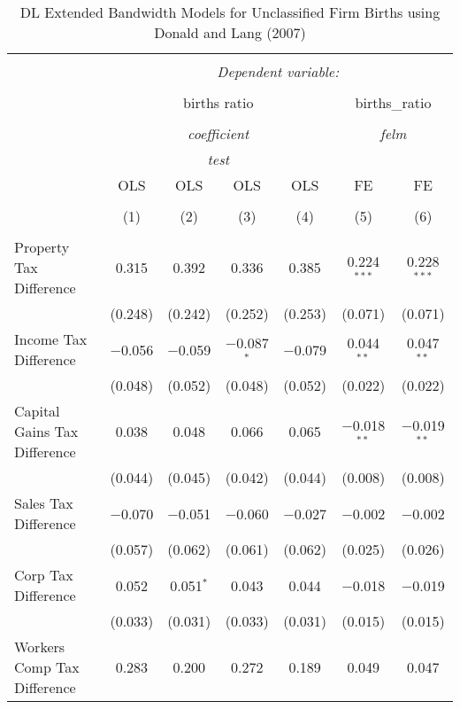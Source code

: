 
\begin{table}[!htbp] \centering 
  \caption{DL Extended Bandwidth Models for  Unclassified Firm Births using Donald and Lang (2007)} 
  \label{} 
\begin{tabular}{@{\extracolsep{5pt}}lcccccc} 
\\[-1.8ex]\hline 
\hline \\[-1.8ex] 
 & \multicolumn{6}{c}{\textit{Dependent variable:}} \\ 
\cline{2-7} 
\\[-1.8ex] & \multicolumn{4}{c}{births ratio} & \multicolumn{2}{c}{births\_ratio} \\ 
\\[-1.8ex] & \multicolumn{4}{c}{\textit{coefficient}} & \multicolumn{2}{c}{\textit{felm}} \\ 
 & \multicolumn{4}{c}{\textit{test}} & \multicolumn{2}{c}{\textit{}} \\ 
 & OLS & OLS & OLS & OLS & FE & FE \\ 
\\[-1.8ex] & (1) & (2) & (3) & (4) & (5) & (6)\\ 
\hline \\[-1.8ex] 
 Property Tax Difference & 0.315 & 0.392 & 0.336 & 0.385 & 0.224$^{***}$ & 0.228$^{***}$ \\ 
  & (0.248) & (0.242) & (0.252) & (0.253) & (0.071) & (0.071) \\ 
  Income Tax Difference & $-$0.056 & $-$0.059 & $-$0.087$^{*}$ & $-$0.079 & 0.044$^{**}$ & 0.047$^{**}$ \\ 
  & (0.048) & (0.052) & (0.048) & (0.052) & (0.022) & (0.022) \\ 
  Capital Gains Tax Difference & 0.038 & 0.048 & 0.066 & 0.065 & $-$0.018$^{**}$ & $-$0.019$^{**}$ \\ 
  & (0.044) & (0.045) & (0.042) & (0.044) & (0.008) & (0.008) \\ 
  Sales Tax Difference & $-$0.070 & $-$0.051 & $-$0.060 & $-$0.027 & $-$0.002 & $-$0.002 \\ 
  & (0.057) & (0.062) & (0.061) & (0.062) & (0.025) & (0.026) \\ 
  Corp Tax Difference & 0.052 & 0.051$^{*}$ & 0.043 & 0.044 & $-$0.018 & $-$0.019 \\ 
  & (0.033) & (0.031) & (0.033) & (0.031) & (0.015) & (0.015) \\ 
  Workers Comp Tax Difference & 0.283 & 0.200 & 0.272 & 0.189 & 0.049 & 0.047 \\ 

\end{tabular}
\end{table}
